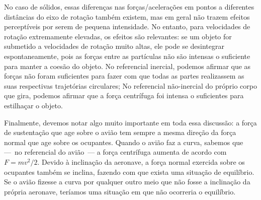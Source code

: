 No caso de sólidos, essas diferenças nas forças/acelerações em pontos a diferentes distâncias do eixo de rotação também existem, mas em geral não trazem efeitos perceptíveis por serem de pequena intensidade. No entanto, para velocidades de rotação extremamente elevadas, os efeitos são relevantes: se um objeto for submetido a velocidades de rotação muito altas, ele pode se desintegrar espontaneamente, pois as forças entre as partículas não são intensas o suficiente para manter a coesão do objeto. No referencial inercial, podemos afirmar que as forças não foram suficientes para fazer com que todas as partes realizassem as suas respectivas trajetórias circulares; No referencial não-inercial do próprio corpo que gira, podemos afirmar que a força centrífuga foi intensa o suficientes para estilhaçar o objeto.

Finalmente, devemos notar algo muito importante em toda essa discussão: a força de sustentação que age sobre o avião tem sempre a mesma direção da força normal que age sobre os ocupantes. Quando o avião faz a curva, sabemos que ---~no referencial do avião~--- a força centrífuga aumenta de acordo com $F = mv^2/2$. Devido à inclinação da aeronave, a força normal exercida sobre os ocupantes também se inclina, fazendo com que exista uma situação de equilíbrio. Se o avião fizesse a curva por qualquer outro meio que não fosse a inclinação da própria aeronave, teríamos uma situação em que não ocorreria o equilíbrio.





